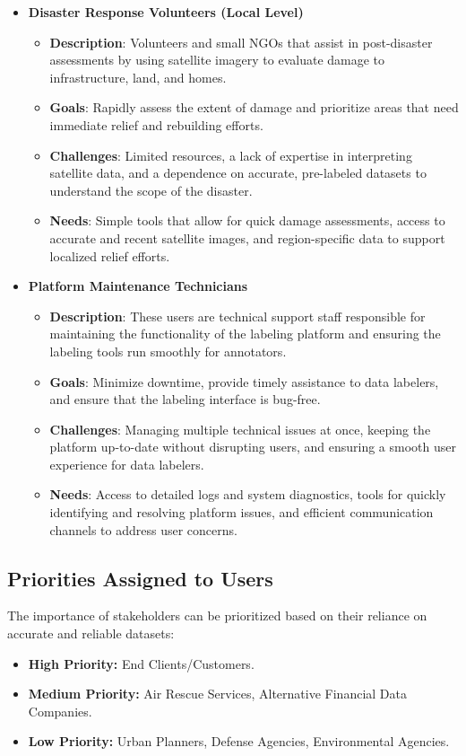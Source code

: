\documentclass[12pt]{article}
\begin{document}
\begin{itemize}
\begin{itemize}
    \end{itemize}
    \item \textbf{Disaster Response Volunteers (Local Level)}
    \begin{itemize}
        \item \textbf{Description}: Volunteers and small NGOs that assist in post-disaster assessments by using satellite imagery to evaluate damage to infrastructure, land, and homes.
        \item \textbf{Goals}: Rapidly assess the extent of damage and prioritize areas that need immediate relief and rebuilding efforts.
        \item \textbf{Challenges}: Limited resources, a lack of expertise in interpreting satellite data, and a dependence on accurate, pre-labeled datasets to understand the scope of the disaster.
        \item \textbf{Needs}: Simple tools that allow for quick damage assessments, access to accurate and recent satellite images, and region-specific data to support localized relief efforts.
    \end{itemize}
    \item \textbf{Platform Maintenance Technicians}
    \begin{itemize}
        \item \textbf{Description}: These users are technical support staff responsible for maintaining the functionality of the labeling platform and ensuring the labeling tools run smoothly for annotators.
        \item \textbf{Goals}: Minimize downtime, provide timely assistance to data labelers, and ensure that the labeling interface is bug-free.
        \item \textbf{Challenges}: Managing multiple technical issues at once, keeping the platform up-to-date without disrupting users, and ensuring a smooth user experience for data labelers.
        \item \textbf{Needs}: Access to detailed logs and system diagnostics, tools for quickly identifying and resolving platform issues, and efficient communication channels to address user concerns.
    \end{itemize}
\end{itemize}

\subsection{Priorities Assigned to Users}
The importance of stakeholders can be prioritized based on their reliance on accurate and reliable datasets:
\begin{itemize}
    \item \textbf{High Priority:} End Clients/Customers.
    \item \textbf{Medium Priority:} Air Rescue Services, Alternative Financial Data Companies.
    \item \textbf{Low Priority:} Urban Planners, Defense Agencies, Environmental Agencies.
\end{itemize}
\end{document}
